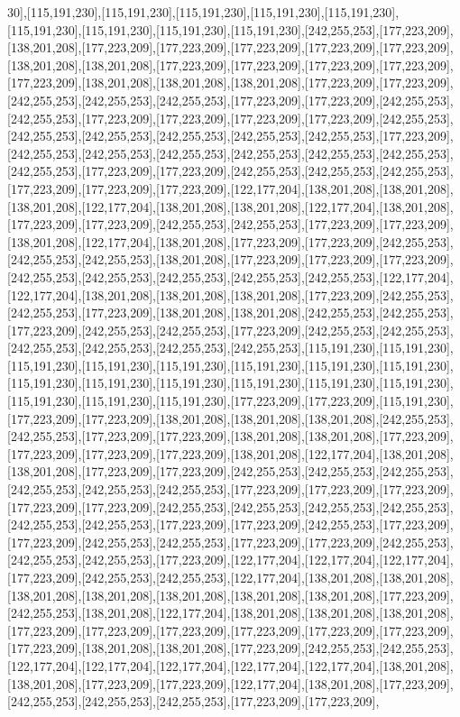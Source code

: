 30],[115,191,230],[115,191,230],[115,191,230],[115,191,230],[115,191,230],[115,191,230],[115,191,230],[115,191,230],[115,191,230],[242,255,253],[177,223,209],[138,201,208],[177,223,209],[177,223,209],[177,223,209],[177,223,209],[177,223,209],[138,201,208],[138,201,208],[177,223,209],[177,223,209],[177,223,209],[177,223,209],[177,223,209],[138,201,208],[138,201,208],[138,201,208],[177,223,209],[177,223,209],[242,255,253],[242,255,253],[242,255,253],[177,223,209],[177,223,209],[242,255,253],[242,255,253],[177,223,209],[177,223,209],[177,223,209],[177,223,209],[242,255,253],[242,255,253],[242,255,253],[242,255,253],[242,255,253],[242,255,253],[177,223,209],[242,255,253],[242,255,253],[242,255,253],[242,255,253],[242,255,253],[242,255,253],[242,255,253],[177,223,209],[177,223,209],[242,255,253],[242,255,253],[242,255,253],[177,223,209],[177,223,209],[177,223,209],[122,177,204],[138,201,208],[138,201,208],[138,201,208],[122,177,204],[138,201,208],[138,201,208],[122,177,204],[138,201,208],[177,223,209],[177,223,209],[242,255,253],[242,255,253],[177,223,209],[177,223,209],[138,201,208],[122,177,204],[138,201,208],[177,223,209],[177,223,209],[242,255,253],[242,255,253],[242,255,253],[138,201,208],[177,223,209],[177,223,209],[177,223,209],[242,255,253],[242,255,253],[242,255,253],[242,255,253],[242,255,253],[122,177,204],[122,177,204],[138,201,208],[138,201,208],[138,201,208],[177,223,209],[242,255,253],[242,255,253],[177,223,209],[138,201,208],[138,201,208],[242,255,253],[242,255,253],[177,223,209],[242,255,253],[242,255,253],[177,223,209],[242,255,253],[242,255,253],[242,255,253],[242,255,253],[242,255,253],[242,255,253],[115,191,230],[115,191,230],[115,191,230],[115,191,230],[115,191,230],[115,191,230],[115,191,230],[115,191,230],[115,191,230],[115,191,230],[115,191,230],[115,191,230],[115,191,230],[115,191,230],[115,191,230],[115,191,230],[115,191,230],[177,223,209],[177,223,209],[115,191,230],[177,223,209],[177,223,209],[138,201,208],[138,201,208],[138,201,208],[242,255,253],[242,255,253],[177,223,209],[177,223,209],[138,201,208],[138,201,208],[177,223,209],[177,223,209],[177,223,209],[177,223,209],[138,201,208],[122,177,204],[138,201,208],[138,201,208],[177,223,209],[177,223,209],[242,255,253],[242,255,253],[242,255,253],[242,255,253],[242,255,253],[242,255,253],[177,223,209],[177,223,209],[177,223,209],[177,223,209],[177,223,209],[242,255,253],[242,255,253],[242,255,253],[242,255,253],[242,255,253],[242,255,253],[177,223,209],[177,223,209],[242,255,253],[177,223,209],[177,223,209],[242,255,253],[242,255,253],[177,223,209],[177,223,209],[242,255,253],[242,255,253],[242,255,253],[177,223,209],[122,177,204],[122,177,204],[122,177,204],[177,223,209],[242,255,253],[242,255,253],[122,177,204],[138,201,208],[138,201,208],[138,201,208],[138,201,208],[138,201,208],[138,201,208],[138,201,208],[177,223,209],[242,255,253],[138,201,208],[122,177,204],[138,201,208],[138,201,208],[138,201,208],[177,223,209],[177,223,209],[177,223,209],[177,223,209],[177,223,209],[177,223,209],[177,223,209],[138,201,208],[138,201,208],[177,223,209],[242,255,253],[242,255,253],[122,177,204],[122,177,204],[122,177,204],[122,177,204],[122,177,204],[138,201,208],[138,201,208],[177,223,209],[177,223,209],[122,177,204],[138,201,208],[177,223,209],[242,255,253],[242,255,253],[242,255,253],[177,223,209],[177,223,209],